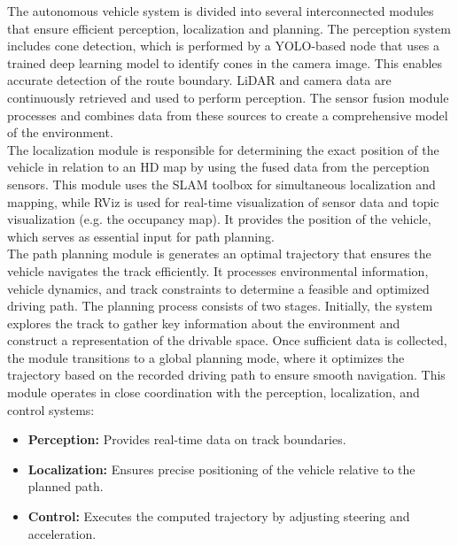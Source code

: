 The autonomous vehicle system is divided into several interconnected modules that ensure efficient perception, localization and planning. 
The perception system includes cone detection, which is performed by a YOLO-based node that uses a trained deep learning model to identify cones in the camera image. This enables accurate detection of the route boundary. 
LiDAR and camera data are continuously retrieved and used to perform perception. The sensor fusion module processes and combines data from these sources to create a comprehensive model of the environment.\\
\newline
The localization module is responsible for determining the exact position of the vehicle in relation to an HD map by using the fused data from the perception sensors. 
This module uses the SLAM toolbox for simultaneous localization and mapping, while RViz is used for real-time visualization of sensor data and topic visualization (e.g. the occupancy map). It provides the position of the vehicle, which serves as essential input for path planning.\\
\newline
The path planning module is generates an optimal trajectory that ensures the vehicle navigates the track efficiently. It processes environmental information, vehicle dynamics, and track constraints to determine a feasible and optimized driving path.
The planning process consists of two stages. Initially, the system explores the track to gather key information about the environment and construct a representation of the drivable space. Once sufficient data is collected, the module transitions to a global planning mode, where it optimizes the trajectory based on the recorded driving path to ensure smooth navigation. 
This module operates in close coordination with the perception, localization, and control systems:
\begin{itemize}
    \item \textbf{Perception:} Provides real-time data on track boundaries.
    \item \textbf{Localization:} Ensures precise positioning of the vehicle relative to the planned path.
    \item \textbf{Control:} Executes the computed trajectory by adjusting steering and acceleration.
\end{itemize}